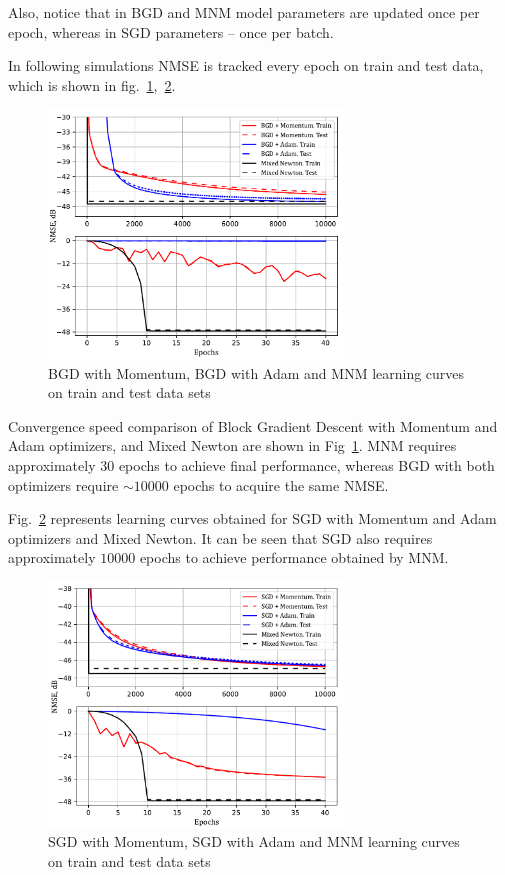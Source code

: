 \documentclass[12pt]{article}
\begin{document}
Also, notice that in BGD and MNM model parameters are updated once per epoch, whereas in SGD parameters -- once per batch.

In following simulations NMSE is tracked every epoch on train and test data, which is shown in fig.~\ref{lc_mnm_bgd},~\ref{lc_mnm_sgd}.

\begin{figure}[h!]
    \centering
    \captionsetup{justification=centering}
    \centerline{\includegraphics[width = 0.7\textwidth]{figures/mnm_bgd/mnm_bgd.pdf}}
    \caption{BGD with Momentum, BGD with Adam and MNM learning curves on train and test data sets}
    \label{lc_mnm_bgd}
\end{figure}

Convergence speed comparison of Block Gradient Descent with Momentum and Adam optimizers, and Mixed Newton are shown in Fig~\ref{lc_mnm_bgd}. MNM requires approximately 30 epochs to achieve final performance, whereas BGD with both optimizers require $\sim10000$ epochs to acquire the same NMSE.

Fig.~\ref{lc_mnm_sgd} represents learning curves obtained for SGD with Momentum and Adam optimizers and Mixed Newton. It can be seen that SGD also requires approximately $10000$ epochs to achieve performance obtained by MNM.
\begin{figure}[h!]
    \centering
    \captionsetup{justification=centering}
    \centerline{\includegraphics[width = 0.7\textwidth]{figures/mnm_sgd/mnm_sgd.pdf}}
    \caption{SGD with Momentum, SGD with Adam and MNM learning curves on train and test data sets}
    \label{lc_mnm_sgd}
\end{figure}
\end{document}
